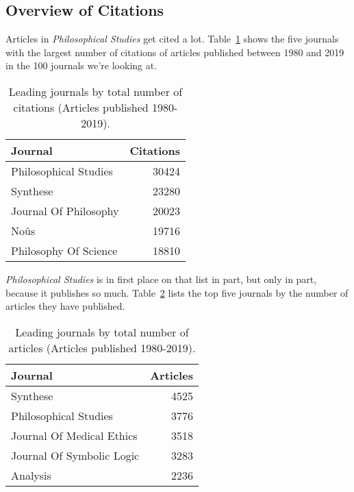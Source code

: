 \documentclass[
  10pt,
  letterpaper,
  DIV=11,
  numbers=noendperiod,
  twoside]{scrartcl}
\begin{document}
\subsection{Overview of Citations}\label{sec-citations-overview}

Articles in \emph{Philosophical Studies} get cited a lot.
Table~\ref{tbl-all-cites} shows the five journals with the largest
number of citations of articles published between 1980 and 2019 in the
100 journals we're looking at.

\begin{longtable}[]{@{}lr@{}}

\caption{\label{tbl-all-cites}Leading journals by total number of
citations (Articles published 1980-2019).}

\tabularnewline

\toprule\noalign{}
Journal & Citations \\
\midrule\noalign{}
\endhead
\bottomrule\noalign{}
\endlastfoot
Philosophical Studies & 30424 \\
Synthese & 23280 \\
Journal Of Philosophy & 20023 \\
Noûs & 19716 \\
Philosophy Of Science & 18810 \\

\end{longtable}

\emph{Philosophical Studies} is in first place on that list in part, but
only in part, because it publishes so much. Table~\ref{tbl-all-articles}
lists the top five journals by the number of articles they have
published.

\begin{longtable}[]{@{}lr@{}}

\caption{\label{tbl-all-articles}Leading journals by total number of
articles (Articles published 1980-2019).}

\tabularnewline

\toprule\noalign{}
Journal & Articles \\
\midrule\noalign{}
\endhead
\bottomrule\noalign{}
\endlastfoot
Synthese & 4525 \\
Philosophical Studies & 3776 \\
Journal Of Medical Ethics & 3518 \\
Journal Of Symbolic Logic & 3283 \\
Analysis & 2236 \\

\end{longtable}
\end{document}
